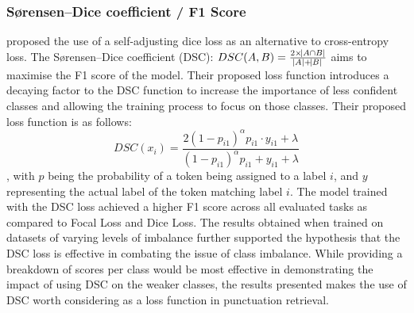 \documentclass[a4paper]{article}
\begin{document}
\subsubsection{Sørensen–Dice coefficient / F1 Score}
\citet{li2020dice} proposed the use of a self-adjusting dice loss as an alternative to cross-entropy loss. The Sørensen–Dice coefficient (DSC): $DSC(A,B)=\frac{2 \times\abs{A \cap B}}{\abs{A} + \abs{B}}$ aims to maximise the F1 score of the model. Their proposed loss function introduces a decaying factor to the DSC function to increase the importance of less confident classes and allowing the training process to focus on those classes. Their proposed loss function is as follows: \[
DSC(x_i)=\frac{2{(1-p_{i1})}^{\alpha}p_{i1}\cdot y_{i1}+\lambda}{{(1-p_{i1})}^{\alpha}p_{i1}+ y_{i1}+\lambda}\], with $p$ being the probability of a token being assigned to a label $i$, and $y$ representing the actual label of the token matching label $i$.
The model trained with the DSC loss achieved a higher F1 score across all evaluated tasks as compared to Focal Loss and Dice Loss. The results obtained when trained on datasets of varying levels of imbalance further supported the hypothesis that the DSC loss is effective in combating the issue of class imbalance. While providing a breakdown of scores per class would be most effective in demonstrating the impact of using DSC on the weaker classes, the results presented makes the use of DSC worth considering as a loss function in punctuation retrieval.




\end{document}
